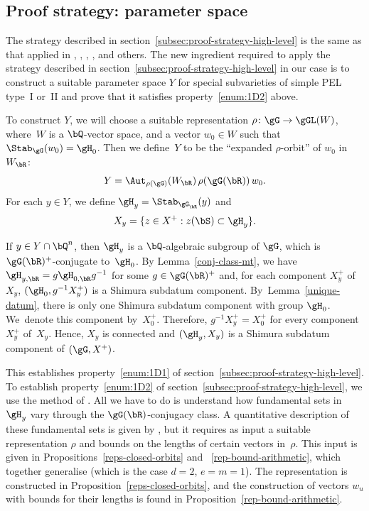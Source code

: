 \subsection{Proof strategy: parameter space} \label{subsec:parameter-space}

The strategy described in section~\ref{subsec:proof-strategy-high-level} is the same as that applied in \cite{HP16}, \cite{DR18}, \cite{ExCM}, \cite{QRTUI}, and others. The new ingredient required to apply the strategy described in section~\ref{subsec:proof-strategy-high-level} in our case is to construct a suitable parameter space $Y$ for special subvarieties of simple PEL type~I or~II and prove that it satisfies property~\eqref{enum:1D2} above.

To construct $Y$, we will choose a suitable representation $\rho \colon \gG \to \gGL(W)$, where~$W$ is a $\bQ$-vector space, and a vector $w_0 \in W$ such that $\Stab_{\gG}(w_0) = \gH_0$.
Then we define~$Y$ to be the ``expanded $\rho$-orbit'' of $w_0$ in $W_\bR$:
\[
Y = \Aut_{\rho(\gG)}(W_\bR) \, \rho(\gG(\bR)) \, w_0.
\]
For each $y \in Y$, we define $\gH_y = \Stab_{\gG_\bR}(y)$ and
\[
X_y = \{ z \in X^+ : z(\bS) \subset \gH_y \}.
\]

If $y \in Y \cap \bQ^n$, then $\gH_y$ is a $\bQ$-algebraic subgroup of $\gG$, which is $\gG(\bR)^+$-conjugate to~$\gH_0$.
By Lemma~\ref{conj-class-mt}, we have $\gH_{y,\bR} = g\gH_{0,\bR}g^{-1}$ for some $g \in \gG(\bR)^+$ and, for each component $X_y^+$ of $X_y$, $(\gH_0, g^{-1}X_y^+)$ is a Shimura subdatum component.
By~Lem\-ma~\ref{unique-datum}, there is only one Shimura subdatum component with group $\gH_0$.
We~denote this component by~$X^+_0$. Therefore, $g^{-1}X_y^+=X^+_0$ for every component~$X_y^+$ of~$X_y$.
Hence, $X_y$ is connected and $(\gH_y, X_y)$ is a Shimura subdatum component of $(\gG, X^+)$.

This establishes property~\eqref{enum:1D1} of section~\ref{subsec:proof-strategy-high-level}. To establish property~\eqref{enum:1D2} of section~\ref{subsec:proof-strategy-high-level}, we use the method of \cite[Prop.\,6.3]{QRTUI}.
All we have to do is understand how fundamental sets in $\gH_y$ vary through the $\gG(\bR)$-conjugacy class.
A quantitative description of these fundamental sets is given by \cite[Th.\,1.2]{QRTUI}, but it requires as input a suitable representation $\rho$ and bounds on the lengths of certain vectors in~$\rho$.
This input is given in Propositions~\ref{reps-closed-orbits} and~ \ref{rep-bound-arithmetic}, which together generalise \cite[Prop.\,5.1]{QRTUI} (which is the case $d=2$, $e=m=1$).
The representation is constructed in Proposition~\ref{reps-closed-orbits}, and the construction of vectors $w_u$ with bounds for their lengths is found in Proposition~\ref{rep-bound-arithmetic}.

